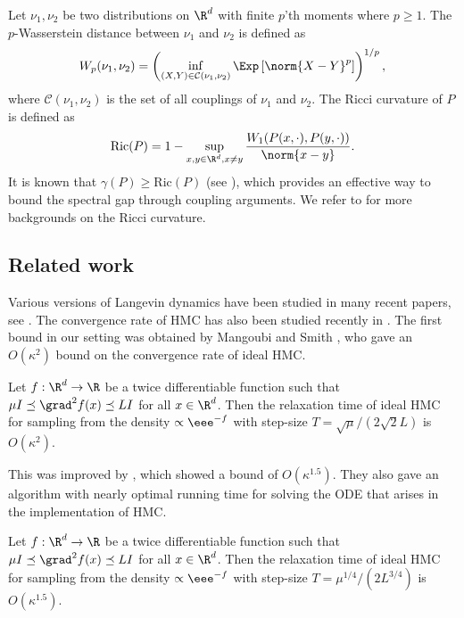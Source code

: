 Let $\nu_1,\nu_2$ be two distributions on $\R^d$ with finite $p$'th moments where $p \ge 1$. 
The $p$-Wasserstein distance between $\nu_1$ and $\nu_2$ is defined as
\[
W_p(\nu_1,\nu_2) = \left( \inf_{(X,Y) \in \mathcal{C}(\nu_1,\nu_2)} \Exp\left[ \norm{X-Y}^p \right] \right)^{1/p},
\]
where $\mathcal{C}(\nu_1,\nu_2)$ is the set of all couplings of $\nu_1$ and $\nu_2$. 
The Ricci curvature of $P$ is defined as
\[
\mathrm{Ric}(P) = 1 - \sup_{x,y \in \R^d, x \neq y} \frac{W_1(P(x, \cdot), P(y, \cdot))}{\norm{x-y}}. 
\]
It is known that $\gamma(P) \ge \mathrm{Ric}(P)$ (see \cite[Proposition 29]{O09}), which provides an effective way to bound the spectral gap through coupling arguments. 
We refer to \cite{O09} for more backgrounds on the Ricci curvature. 
	
	

\subsection{Related work}
Various versions of Langevin dynamics have been studied in many recent papers, see \cite{D17,DK19, ZLC17,RRT17, DRD18,CCBJ, CCABJ18,CFMBJ18, DCWY18,W18, VW19,MCCFBJ19}. 
The convergence rate of HMC %
has also been   %
studied recently in \cite{LSV18,LV18,MS17, MS19,MV18,SRH14}. 
%
The first bound %
in  %
our setting was obtained by Mangoubi and Smith \cite{MS17}, who gave an $O(\kappa^2)$ bound on the convergence rate of ideal HMC. 

\begin{theorem}[{\cite[Theorem 1]{MS17}}]
	Let $f:\R^d \to\R$ be a twice differentiable function such that $\mu I \preceq \grad^2 f(x) \preceq L I$ for all $x\in\R^d$. 
	Then the relaxation time of ideal HMC for sampling from the density $\propto \eee^{-f}$ with step-size $T = \sqrt{\mu}/(2\sqrt{2} L)$ is $O(\kappa^{2})$.  
\end{theorem}


This was improved by \cite{LSV18}, which showed a bound of $O(\kappa^{1.5})$. 
They also gave an algorithm with nearly optimal running time for solving the ODE that arises in the implementation of HMC.  

\begin{theorem}
	Let $f:\R^d \to\R$ be a twice differentiable function such that $\mu I \preceq \grad^2 f(x) \preceq L I$ for all $x\in\R^d$. 
	Then the relaxation time of ideal HMC for sampling from the density $\propto \eee^{-f}$ with step-size $T = \mu^{1/4}/(2L^{3/4})$ is $O(\kappa^{1.5})$.  
\end{theorem}


